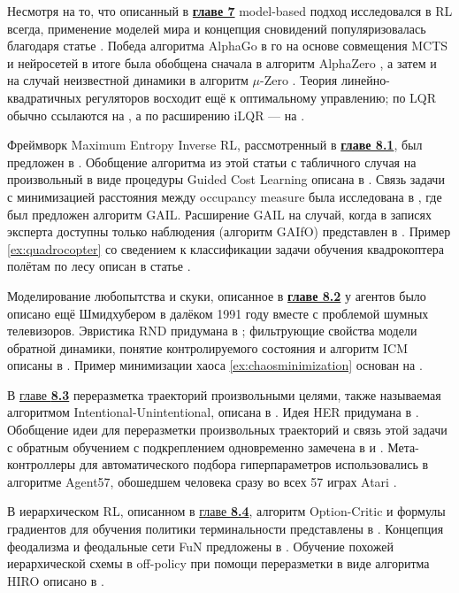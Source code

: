Несмотря на то, что описанный в \underline{\textbf{главе 7}} model-based подход исследовался в RL всегда, применение моделей мира и концепция сновидений популяризовалась благодаря статье \cite{ha2018world}. Победа алгоритма AlphaGo в го на основе совмещения MCTS и нейросетей в итоге была обобщена сначала в алгоритм AlphaZero \cite{silver2018general}, а затем и на случай неизвестной динамики в алгоритм $\mu$-Zero \cite{schrittwieser2019mastering}. Теория линейно-квадратичных регуляторов восходит ещё к оптимальному управлению; по LQR обычно ссылаются на \cite{bemporad2002explicit}, а по расширению iLQR --- на \cite{li2004iterative}.

Фреймворк Maximum Entropy Inverse RL, рассмотренный в \underline{\textbf{главе 8.1}}, был предложен в \cite{ziebart2008maximum}. Обобщение алгоритма из этой статьи с табличного случая на произвольный в виде процедуры Guided Cost Learning описана в \cite{finn2016guided}. Связь задачи с минимизацией расстояния между occupancy measure была исследована в \cite{ho2016generative}, где был предложен алгоритм GAIL. Расширение GAIL на случай, когда в записях эксперта доступны только наблюдения (алгоритм GAIfO) представлен в \cite{torabi2018generative}. Пример \ref{ex:quadrocopter} со сведением к классификации задачи обучения квадрокоптера полётам по лесу описан в статье \cite{giusti2015machine}. 

Моделирование любопытства и скуки, описанное в \underline{\textbf{главе 8.2}} у агентов было описано ещё Шмидхубером в далёком 1991 году \cite{schmidhuber1991possibility} вместе с проблемой шумных телевизоров. Эвристика RND придумана в \cite{burda2018exploration}; фильтрующие свойства модели обратной динамики, понятие контролируемого состояния и алгоритм ICM описаны в \cite{pathak2017curiosity}. Пример минимизации хаоса \ref{ex:chaosminimization} основан на \cite{berseth2019smirl}.

В \underline{главе \textbf{8.3}} переразметка траекторий произвольными целями, также называемая алгоритмом Intentional-Unintentional, описана в \cite{cabi2017intentional}. Идея HER придумана в \cite{andrychowicz2017hindsight}. Обобщение идеи для переразметки произвольных траекторий и связь этой задачи с обратным обучением с подкреплением одновременно замечена в \cite{eysenbach2020rewriting} и \cite{li2020generalized}. Мета-контроллеры для автоматического подбора гиперпараметров использовались в алгоритме Agent57, обошедшем человека сразу во всех 57 играх Atari \cite{badia2020agent57}.

В иерархическом RL, описанном в \underline{главе \textbf{8.4}}, алгоритм Option-Critic и формулы градиентов для обучения политики терминальности представлены в \cite{bacon2017option}. Концепция феодализма и феодальные сети FuN предложены в \cite{vezhnevets2017feudal}. Обучение похожей иерархической схемы в off-policy при помощи переразметки в виде алгоритма HIRO описано в \cite{nachum2018data}.

